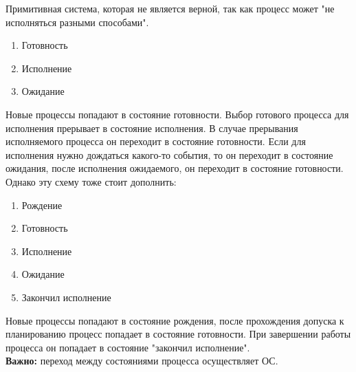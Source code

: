 \documentclass[12pt, a4paper]{article}
\begin{document}
    Примитивная система, которая не является верной, так как процесс может "не исполняться разными способами".
    \begin{enumerate}
        \item Готовность
        \item Исполнение
        \item Ожидание
    \end{enumerate}
    Новые процессы попадают в состояние готовности. Выбор готового процесса для исполнения прерывает в состояние исполнения. 
    В случае прерывания исполняемого процесса он переходит в состояние готовности. Если для исполнения нужно дождаться 
    какого-то события, то он переходит в состояние ожидания, после исполнения ожидаемого, он переходит в состояние готовности.\\
    Однако эту схему тоже стоит дополнить:
    \begin{enumerate}
        \item Рождение
        \item Готовность
        \item Исполнение 
        \item Ожидание
        \item Закончил исполнение
    \end{enumerate}
    Новые процессы попадают в состояние рождения, после прохождения допуска к планированию процесс попадает в состояние готовности.
    При завершении работы процесса он попадает в состояние "закончил исполнение".\\
    \textbf{Важно:} переход между состояниями процесса осуществляет ОС.
\end{document}
